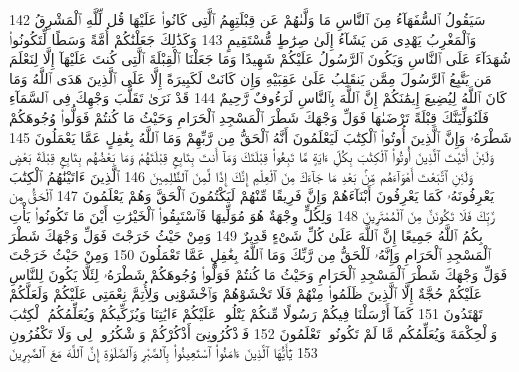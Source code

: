 {\tiny\colorbox{cl_aya}{142}} سَيَقُولُ ٱلسُّفَهَآءُ مِنَ ٱلنَّاسِ مَا وَلَّىٰهُمْ عَن قِبْلَتِهِمُ ٱلَّتِى كَانُوا۟ عَلَيْهَا قُل لِّلَّهِ ٱلْمَشْرِقُ وَٱلْمَغْرِبُ يَهْدِى مَن يَشَآءُ إِلَىٰ صِرَٰطٍ مُّسْتَقِيمٍ
{\tiny\colorbox{cl_aya}{143}} وَكَذَٰلِكَ جَعَلْنَٰكُمْ أُمَّةً وَسَطًا لِّتَكُونُوا۟ شُهَدَآءَ عَلَى ٱلنَّاسِ وَيَكُونَ ٱلرَّسُولُ عَلَيْكُمْ شَهِيدًا وَمَا جَعَلْنَا ٱلْقِبْلَةَ ٱلَّتِى كُنتَ عَلَيْهَآ إِلَّا لِنَعْلَمَ مَن يَتَّبِعُ ٱلرَّسُولَ مِمَّن يَنقَلِبُ عَلَىٰ عَقِبَيْهِ وَإِن كَانَتْ لَكَبِيرَةً إِلَّا عَلَى ٱلَّذِينَ هَدَى ٱللَّهُ وَمَا كَانَ ٱللَّهُ لِيُضِيعَ إِيمَٰنَكُمْ إِنَّ ٱللَّهَ بِٱلنَّاسِ لَرَءُوفٌ رَّحِيمٌ
{\tiny\colorbox{cl_aya}{144}} قَدْ نَرَىٰ تَقَلُّبَ وَجْهِكَ فِى ٱلسَّمَآءِ فَلَنُوَلِّيَنَّكَ قِبْلَةً تَرْضَىٰهَا فَوَلِّ وَجْهَكَ شَطْرَ ٱلْمَسْجِدِ ٱلْحَرَامِ وَحَيْثُ مَا كُنتُمْ فَوَلُّوا۟ وُجُوهَكُمْ شَطْرَهُۥ وَإِنَّ ٱلَّذِينَ أُوتُوا۟ ٱلْكِتَٰبَ لَيَعْلَمُونَ أَنَّهُ ٱلْحَقُّ مِن رَّبِّهِمْ وَمَا ٱللَّهُ بِغَٰفِلٍ عَمَّا يَعْمَلُونَ
{\tiny\colorbox{cl_aya}{145}} وَلَئِنْ أَتَيْتَ ٱلَّذِينَ أُوتُوا۟ ٱلْكِتَٰبَ بِكُلِّ ءَايَةٍ مَّا تَبِعُوا۟ قِبْلَتَكَ وَمَآ أَنتَ بِتَابِعٍ قِبْلَتَهُمْ وَمَا بَعْضُهُم بِتَابِعٍ قِبْلَةَ بَعْضٍ وَلَئِنِ ٱتَّبَعْتَ أَهْوَآءَهُم مِّنۢ بَعْدِ مَا جَآءَكَ مِنَ ٱلْعِلْمِ إِنَّكَ إِذًا لَّمِنَ ٱلظَّٰلِمِينَ
{\tiny\colorbox{cl_aya}{146}} ٱلَّذِينَ ءَاتَيْنَٰهُمُ ٱلْكِتَٰبَ يَعْرِفُونَهُۥ كَمَا يَعْرِفُونَ أَبْنَآءَهُمْ وَإِنَّ فَرِيقًا مِّنْهُمْ لَيَكْتُمُونَ ٱلْحَقَّ وَهُمْ يَعْلَمُونَ
{\tiny\colorbox{cl_aya}{147}} ٱلْحَقُّ مِن رَّبِّكَ فَلَا تَكُونَنَّ مِنَ ٱلْمُمْتَرِينَ
{\tiny\colorbox{cl_aya}{148}} وَلِكُلٍّ وِجْهَةٌ هُوَ مُوَلِّيهَا فَٱسْتَبِقُوا۟ ٱلْخَيْرَٰتِ أَيْنَ مَا تَكُونُوا۟ يَأْتِ بِكُمُ ٱللَّهُ جَمِيعًا إِنَّ ٱللَّهَ عَلَىٰ كُلِّ شَىْءٍ قَدِيرٌ
{\tiny\colorbox{cl_aya}{149}} وَمِنْ حَيْثُ خَرَجْتَ فَوَلِّ وَجْهَكَ شَطْرَ ٱلْمَسْجِدِ ٱلْحَرَامِ وَإِنَّهُۥ لَلْحَقُّ مِن رَّبِّكَ وَمَا ٱللَّهُ بِغَٰفِلٍ عَمَّا تَعْمَلُونَ
{\tiny\colorbox{cl_aya}{150}} وَمِنْ حَيْثُ خَرَجْتَ فَوَلِّ وَجْهَكَ شَطْرَ ٱلْمَسْجِدِ ٱلْحَرَامِ وَحَيْثُ مَا كُنتُمْ فَوَلُّوا۟ وُجُوهَكُمْ شَطْرَهُۥ لِئَلَّا يَكُونَ لِلنَّاسِ عَلَيْكُمْ حُجَّةٌ إِلَّا ٱلَّذِينَ ظَلَمُوا۟ مِنْهُمْ فَلَا تَخْشَوْهُمْ وَٱخْشَوْنِى وَلِأُتِمَّ نِعْمَتِى عَلَيْكُمْ وَلَعَلَّكُمْ تَهْتَدُونَ
{\tiny\colorbox{cl_aya}{151}} كَمَآ أَرْسَلْنَا فِيكُمْ رَسُولًا مِّنكُمْ يَتْلُوا۟ عَلَيْكُمْ ءَايَٰتِنَا وَيُزَكِّيكُمْ وَيُعَلِّمُكُمُ ٱلْكِتَٰبَ وَٱلْحِكْمَةَ وَيُعَلِّمُكُم مَّا لَمْ تَكُونُوا۟ تَعْلَمُونَ
{\tiny\colorbox{cl_aya}{152}} فَٱذْكُرُونِىٓ أَذْكُرْكُمْ وَٱشْكُرُوا۟ لِى وَلَا تَكْفُرُونِ
{\tiny\colorbox{cl_aya}{153}} يَٰٓأَيُّهَا ٱلَّذِينَ ءَامَنُوا۟ ٱسْتَعِينُوا۟ بِٱلصَّبْرِ وَٱلصَّلَوٰةِ إِنَّ ٱللَّهَ مَعَ ٱلصَّٰبِرِينَ
